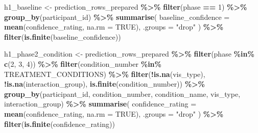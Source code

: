 \documentclass[
]{article}
\newenvironment{Shaded}{\begin{snugshade}}{\end{snugshade}}
\newcommand{\AttributeTok}[1]{\textcolor[rgb]{0.13,0.29,0.53}{#1}}
\newcommand{\ConstantTok}[1]{\textcolor[rgb]{0.56,0.35,0.01}{#1}}
\newcommand{\DecValTok}[1]{\textcolor[rgb]{0.00,0.00,0.81}{#1}}
\newcommand{\FunctionTok}[1]{\textcolor[rgb]{0.13,0.29,0.53}{\textbf{#1}}}
\newcommand{\NormalTok}[1]{#1}
\newcommand{\OtherTok}[1]{\textcolor[rgb]{0.56,0.35,0.01}{#1}}
\newcommand{\SpecialCharTok}[1]{\textcolor[rgb]{0.81,0.36,0.00}{\textbf{#1}}}
\newcommand{\StringTok}[1]{\textcolor[rgb]{0.31,0.60,0.02}{#1}}
\begin{document}
\begin{Shaded}
\begin{Highlighting}[]
\NormalTok{h1\_baseline }\OtherTok{\textless{}{-}}\NormalTok{ prediction\_rows\_prepared }\SpecialCharTok{\%\textgreater{}\%}
  \FunctionTok{filter}\NormalTok{(phase }\SpecialCharTok{==} \DecValTok{1}\NormalTok{) }\SpecialCharTok{\%\textgreater{}\%}
  \FunctionTok{group\_by}\NormalTok{(participant\_id) }\SpecialCharTok{\%\textgreater{}\%}
  \FunctionTok{summarise}\NormalTok{(}
    \AttributeTok{baseline\_confidence =} \FunctionTok{mean}\NormalTok{(confidence\_rating, }\AttributeTok{na.rm =} \ConstantTok{TRUE}\NormalTok{),}
    \AttributeTok{.groups =} \StringTok{"drop"}
\NormalTok{  ) }\SpecialCharTok{\%\textgreater{}\%}
  \FunctionTok{filter}\NormalTok{(}\FunctionTok{is.finite}\NormalTok{(baseline\_confidence))}

\NormalTok{h1\_phase2\_condition }\OtherTok{\textless{}{-}}\NormalTok{ prediction\_rows\_prepared }\SpecialCharTok{\%\textgreater{}\%}
  \FunctionTok{filter}\NormalTok{(phase }\SpecialCharTok{\%in\%} \FunctionTok{c}\NormalTok{(}\DecValTok{2}\NormalTok{, }\DecValTok{3}\NormalTok{, }\DecValTok{4}\NormalTok{)) }\SpecialCharTok{\%\textgreater{}\%}
  \FunctionTok{filter}\NormalTok{(condition\_number }\SpecialCharTok{\%in\%}\NormalTok{ TREATMENT\_CONDITIONS) }\SpecialCharTok{\%\textgreater{}\%}
  \FunctionTok{filter}\NormalTok{(}\SpecialCharTok{!}\FunctionTok{is.na}\NormalTok{(vis\_type), }\SpecialCharTok{!}\FunctionTok{is.na}\NormalTok{(interaction\_group), }\FunctionTok{is.finite}\NormalTok{(condition\_number)) }\SpecialCharTok{\%\textgreater{}\%}
  \FunctionTok{group\_by}\NormalTok{(participant\_id, condition\_number, condition\_name, vis\_type, interaction\_group) }\SpecialCharTok{\%\textgreater{}\%}
  \FunctionTok{summarise}\NormalTok{(}
    \AttributeTok{confidence\_rating =} \FunctionTok{mean}\NormalTok{(confidence\_rating, }\AttributeTok{na.rm =} \ConstantTok{TRUE}\NormalTok{),}
    \AttributeTok{.groups =} \StringTok{"drop"}
\NormalTok{  ) }\SpecialCharTok{\%\textgreater{}\%}
  \FunctionTok{filter}\NormalTok{(}\FunctionTok{is.finite}\NormalTok{(confidence\_rating))}


\end{Highlighting}
\end{Shaded}
\end{document}
